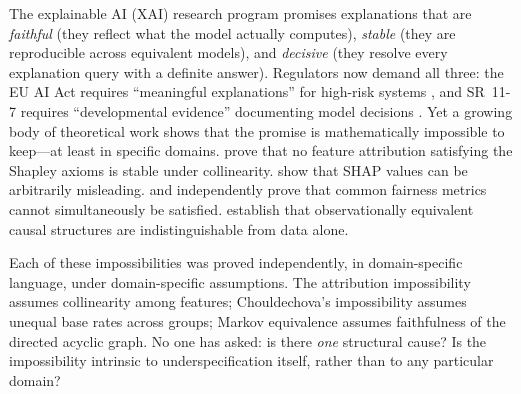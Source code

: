\documentclass[11pt,a4paper]{article}
\begin{document}
The explainable AI (XAI) research program promises explanations that are
\emph{faithful} (they reflect what the model actually computes),
\emph{stable} (they are reproducible across equivalent models), and
\emph{decisive} (they resolve every explanation query with a definite answer).
Regulators now demand all three: the EU AI Act requires ``meaningful
explanations'' for high-risk systems \citep{euaiact2024}, and SR~11-7 requires
``developmental evidence'' documenting model decisions
\citep{occ2011sr117}.  Yet a growing body of theoretical work shows that the
promise is mathematically impossible to keep---at least in specific domains.
\citet{bilodeau2024impossibility} prove that no feature attribution satisfying
the Shapley axioms is stable under collinearity.
\citet{huang2024failings} show that SHAP values can be arbitrarily
misleading.  \citet{chouldechova2017fair} and \citet{kleinberg2017inherent}
independently prove that common fairness metrics cannot simultaneously be
satisfied.  \citet{verma1991equivalence} establish that observationally
equivalent causal structures are indistinguishable from data alone.

Each of these impossibilities was proved independently, in domain-specific
language, under domain-specific assumptions.  The attribution impossibility
assumes collinearity among features; Chouldechova's impossibility assumes
unequal base rates across groups; Markov equivalence assumes faithfulness of
the directed acyclic graph.  No one has asked: is there \emph{one} structural
cause?  Is the impossibility intrinsic to underspecification itself, rather
than to any particular domain?
\end{document}

